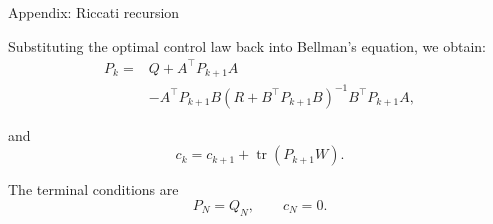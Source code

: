 \documentclass{beamer}
\begin{document}
\begin{frame}{Appendix: Riccati recursion}
	\begin{flushleft}
	
	Substituting the optimal control law back into Bellman's equation,
	we obtain:
	\[
	\begin{aligned}
		P_k={}&Q+A^\top P_{k+1}A\\
		&-A^\top P_{k+1}B
		(R+B^\top P_{k+1}B)^{-1}
		B^\top P_{k+1}A,
	\end{aligned}
	\]
	
	and
	\[
	c_k=c_{k+1}+\operatorname{tr}(P_{k+1}W).
	\]
	
	The terminal conditions are
	\[
	P_N=Q_N,\qquad c_N=0.
	\]
	
	\end{flushleft}
\end{frame}
\end{document}
